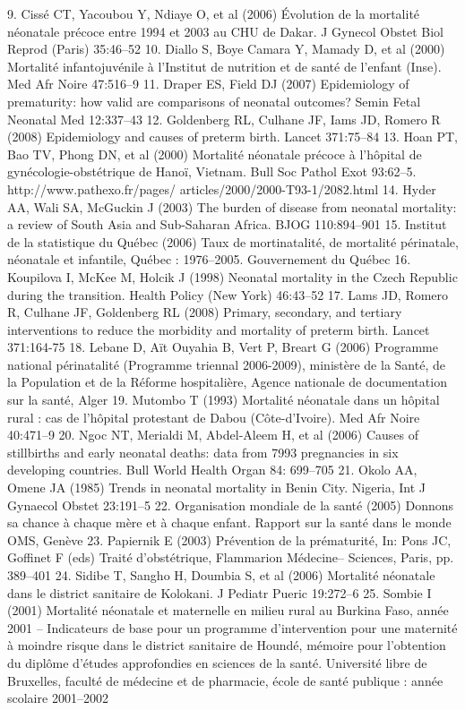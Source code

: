 9. Cissé CT, Yacoubou Y, Ndiaye O, et al (2006) Évolution de la
mortalité néonatale précoce entre 1994 et 2003 au CHU de Dakar.
J Gynecol Obstet Biol Reprod (Paris) 35:46–52
10. Diallo S, Boye Camara Y, Mamady D, et al (2000) Mortalité
infantojuvénile à l’Institut de nutrition et de santé de l’enfant
(Inse). Med Afr Noire 47:516–9
11. Draper ES, Field DJ (2007) Epidemiology of prematurity: how
valid are comparisons of neonatal outcomes? Semin Fetal
Neonatal Med 12:337–43
12. Goldenberg RL, Culhane JF, Iams JD, Romero R (2008)
Epidemiology and causes of preterm birth. Lancet 371:75–84
13. Hoan PT, Bao TV, Phong DN, et al (2000) Mortalité néonatale
précoce à l’hôpital de gynécologie-obstétrique de Hanoï, Vietnam.
Bull Soc Pathol Exot 93:62–5. http://www.pathexo.fr/pages/
articles/2000/2000-T93-1/2082.html
14. Hyder AA, Wali SA, McGuckin J (2003) The burden of disease
from neonatal mortality: a review of South Asia and Sub-Saharan
Africa. BJOG 110:894–901
15. Institut de la statistique du Québec (2006) Taux de mortinatalité,
de mortalité périnatale, néonatale et infantile, Québec :
1976–2005. Gouvernement du Québec
16. Koupilova I, McKee M, Holcik J (1998) Neonatal mortality in the
Czech Republic during the transition. Health Policy (New York)
46:43–52
17. Lams JD, Romero R, Culhane JF, Goldenberg RL (2008) Primary,
secondary, and tertiary interventions to reduce the morbidity and
mortality of preterm birth. Lancet 371:164-75
18. Lebane D, Aït Ouyahia B, Vert P, Breart G (2006) Programme
national périnatalité (Programme triennal 2006-2009), ministère
de la Santé, de la Population et de la Réforme hospitalière, Agence
nationale de documentation sur la santé, Alger
19. Mutombo T (1993) Mortalité néonatale dans un hôpital rural : cas
de l’hôpital protestant de Dabou (Côte-d’Ivoire). Med Afr Noire
40:471–9
20. Ngoc NT, Merialdi M, Abdel-Aleem H, et al (2006) Causes of
stillbirths and early neonatal deaths: data from 7993 pregnancies
in six developing countries. Bull World Health Organ 84:
699–705
21. Okolo AA, Omene JA (1985) Trends in neonatal mortality in
Benin City. Nigeria, Int J Gynaecol Obstet 23:191–5
22. Organisation mondiale de la santé (2005) Donnons sa chance à
chaque mère et à chaque enfant. Rapport sur la santé dans le
monde OMS, Genève
23. Papiernik E (2003) Prévention de la prématurité, In: Pons JC,
Goffinet F (eds) Traité d’obstétrique, Flammarion Médecine–
Sciences, Paris, pp. 389–401
24. Sidibe T, Sangho H, Doumbia S, et al (2006) Mortalité
néonatale dans le district sanitaire de Kolokani. J Pediatr Pueric
19:272–6
25. Sombie I (2001) Mortalité néonatale et maternelle en milieu
rural au Burkina Faso, année 2001 – Indicateurs de base pour
un programme d’intervention pour une maternité à moindre
risque dans le district sanitaire de Houndé, mémoire pour
l’obtention du diplôme d’études approfondies en sciences de
la santé. Université libre de Bruxelles, faculté de médecine
et de pharmacie, école de santé publique : année scolaire
2001–2002	